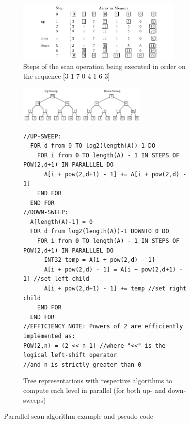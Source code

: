   \begin{figure}[h!]
  \begin{mdframed}
    \centering
    \begin{subfigure}[b]{0.8\textwidth}
      \includegraphics[width=0.9\textwidth]{scanOperationOnArray.png}
      \caption{Steps of the scan operation being executed in order on the sequence [3 1 7 0 4 1 6 3]}
      \label{UPSWEEP_DOWNSWEEP}
    \end{subfigure}
    \begin{subfigure}[b]{\textwidth}
      \centering
      \includegraphics[width=0.7\textwidth]{upsweep_downsweep.png}
      \begin{minipage}{\textwidth}
        \begin{verbatim}
//UP-SWEEP:
  FOR d from 0 TO log2(length(A))-1 DO
    FOR i from 0 TO length(A) - 1 IN STEPS OF POW(2,d+1) IN PARALLLEL DO
      A[i + pow(2,d+1) - 1] += A[i + pow(2,d) - 1]
    END FOR
  END FOR
//DOWN-SWEEP:
  A[length(A)-1] = 0
  FOR d from log2(length(A))-1 DOWNTO 0 DO
    FOR i from 0 TO length(A) - 1 IN STEPS OF POW(2,d+1) IN PARALLLEL DO
      INT32 temp = A[i + pow(2,d) - 1]
      A[i + pow(2,d) - 1] = A[i + pow(2,d+1) - 1] //set left child
      A[i + pow(2,d+1) - 1] += temp //set right child
    END FOR
  END FOR
//EFFICIENCY NOTE: Powers of 2 are efficiently implemented as:
POW(2,n) = (2 << n-1) //where "<<" is the logical left-shift operator
//and n is strictly greater than 0
        \end{verbatim}       
      \end{minipage}
      \caption{Tree representations with respective algorithms to compute each level in parallel (for both up- and down-sweeps)}
      \label{PARALLEL_SCAN_SUB_ALGORITHMS}
    \end{subfigure}
    \caption{Parrallel scan algorithm example and pseudo code \cite{blelloch1990prefix}}
    \label{PARALLEL_SCAN}
  \end{mdframed}
  \end{figure}
 
